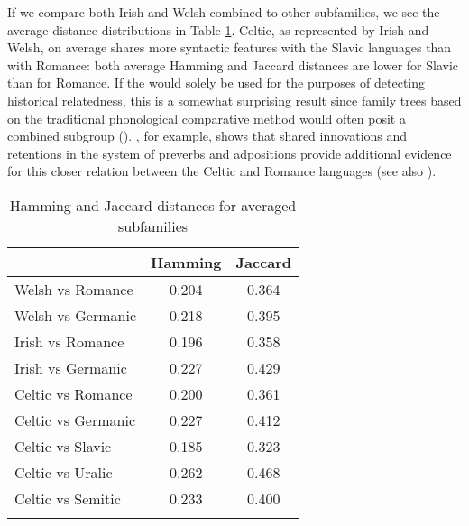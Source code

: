 \documentclass[output=paper,colorlinks,citecolor=brown]{langscibook}
\begin{document}
If we compare both Irish and Welsh combined to other subfamilies, we see the average distance distributions in Table \ref{tab:nums}. Celtic, as represented by Irish and Welsh, on average shares more syntactic features with the Slavic languages than with Romance: both average Hamming and Jaccard distances are lower for Slavic than for Romance. If the  would solely be used for the purposes of detecting historical relatedness, this is a somewhat surprising result since family trees based on the traditional phonological comparative method would often posit a combined  subgroup (\citealt{mm:weiss2022}). \citet{mm:weissforth}, for example,  shows that shared innovations and retentions in the system of preverbs and adpositions provide additional evidence for this closer relation between the Celtic and Romance languages (see also ). 

\begin{table}
\begin{tabular}{lcc}
\lsptoprule
 & Hamming & Jaccard \\ \midrule
Welsh vs Romance         & 0.204                           & 0.364                 \\
Welsh vs Germanic        & 0.218                  & 0.395                  \\\midrule
Irish vs Romance         & 0.196                  & 0.358                  \\
Irish vs Germanic        & 0.227                           & 0.429                           \\\midrule
Celtic vs Romance        & 0.200                           & 0.361                           \\
Celtic vs Germanic       & 0.227                           & 0.412                           \\
Celtic vs Slavic         & 0.185                           & 0.323                           \\
Celtic vs Uralic         & 0.262                           & 0.468                           \\
Celtic vs Semitic        & 0.233                           & 0.400                           \\
 \lspbottomrule
\end{tabular}
\caption{Hamming and Jaccard distances for averaged subfamilies}
\label{tab:nums}
\end{table}
\end{document}
